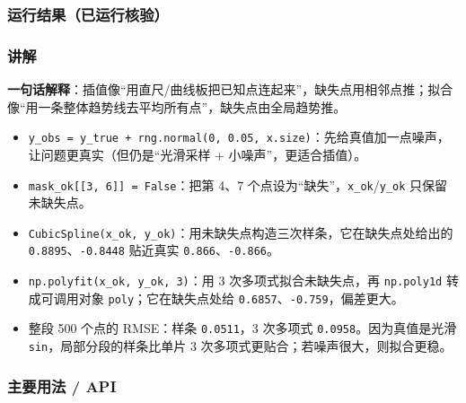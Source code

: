 \subsubsection{运行结果（已运行核验）}\label{ux8fd0ux884cux7ed3ux679cux5df2ux8fd0ux884cux6838ux9a8c-16}

\begin{Shaded}
\begin{Highlighting}[]
\end{Highlighting}
\end{Shaded}

\subsubsection{讲解}\label{ux8bb2ux89e3-16}

\textbf{一句话解释}：插值像``用直尺/曲线板把已知点连起来''，缺失点用相邻点推；拟合像``用一条整体趋势线去平均所有点''，缺失点由全局趋势推。

\begin{itemize}
\tightlist
\item
  \texttt{y\_obs\ =\ y\_true\ +\ rng.normal(0,\ 0.05,\ x.size)}：先给真值加一点噪声，让问题更真实（但仍是``光滑采样
  + 小噪声''，更适合插值）。
\item
  \texttt{mask\_ok{[}{[}3,\ 6{]}{]}\ =\ False}：把第 4、7
  个点设为``缺失''，\texttt{x\_ok}/\texttt{y\_ok} 只保留未缺失点。
\item
  \texttt{CubicSpline(x\_ok,\ y\_ok)}：用未缺失点构造三次样条，它在缺失点处给出的
  \texttt{0.8895}、\texttt{-0.8448} 贴近真实
  \texttt{0.866}、\texttt{-0.866}。
\item
  \texttt{np.polyfit(x\_ok,\ y\_ok,\ 3)}：用 3 次多项式拟合未缺失点，再
  \texttt{np.poly1d} 转成可调用对象 \texttt{poly}；它在缺失点处给
  \texttt{0.6857}、\texttt{-0.759}，偏差更大。
\item
  整段 500 个点的 RMSE：样条 \texttt{0.0511}，3 次多项式
  \texttt{0.0958}。因为真值是光滑 \texttt{sin}，局部分段的样条比单片 3
  次多项式更贴合；若噪声很大，则拟合更稳。
\end{itemize}

\subsubsection{主要用法 / API}\label{ux4e3bux8981ux7528ux6cd5-api-16}

